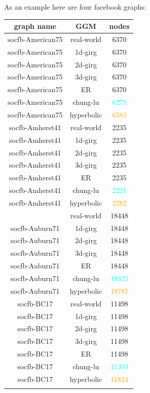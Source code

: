 As an example here are four facebook graphs:

\begin{table}[]
    \centering
    \begin{tabular}{|c|c|c|}
    \hline
    \textbf{graph name} & \textbf{GGM} & \textbf{nodes} \\ \hline
    socfb-American75 & real-world & 6370 \\ \hline
    socfb-American75 & 1d-girg & 6370 \\ \hline
    socfb-American75 & 2d-girg & 6370 \\ \hline
    socfb-American75 & 3d-girg & 6370 \\ \hline
    socfb-American75 & ER & 6370 \\ \hline
    socfb-American75 & chung-lu & \textcolor{cyan}{6279} \\ \hline
    socfb-American75 & hyperbolic & \textcolor{orange}{6583} \\ \hline
    
    socfb-Amherst41 & real-world & 2235 \\ \hline
    socfb-Amherst41 & 1d-girg & 2235 \\ \hline
    socfb-Amherst41 & 2d-girg & 2235 \\ \hline
    socfb-Amherst41 & 3d-girg & 2235 \\ \hline
    socfb-Amherst41 & ER & 2235 \\ \hline
    socfb-Amherst41 & chung-lu & \textcolor{cyan}{2221} \\ \hline
    socfb-Amherst41 & hyperbolic & \textcolor{orange}{2282} \\ \hline

\end{tabular}
\end{table}
